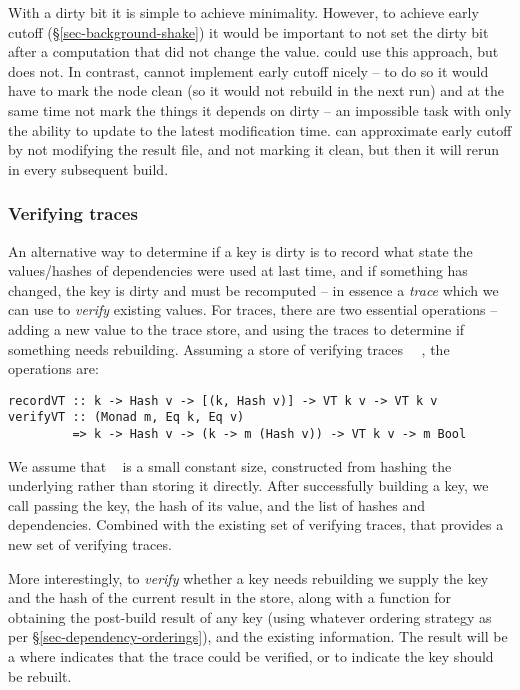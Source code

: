 With a dirty bit it is simple to achieve minimality. However, to achieve early cutoff
(\S\ref{sec-background-shake}) it would be important to not set the dirty bit
after a computation that did not change the value. \Excel could use this
approach, but does not. In contrast, \Make cannot implement early cutoff nicely -- to
do so it would have to mark the node clean (so it would not rebuild in the next
run) and at the same time not mark the things it depends on dirty -- an
impossible task with only the ability to update to the latest modification time.
\Make can approximate early cutoff by not modifying the result file, and not marking it clean,
but then it will rerun in every subsequent build.

\vspace{-2mm}
\subsubsection{Verifying traces}\label{sec-verifying-traces}

An alternative way to determine if a key is dirty is to record what state the
values/hashes of dependencies were used at last time, and if something has
changed, the key is dirty and must be recomputed -- in essence a \emph{trace}
which we can use to \emph{verify} existing values. For traces, there are two essential
operations -- adding a new value to the trace store, and using the traces to determine if something needs
rebuilding. Assuming a store of verifying traces ~~, the operations are:

\begin{verbatim}
recordVT :: k -> Hash v -> [(k, Hash v)] -> VT k v -> VT k v
verifyVT :: (Monad m, Eq k, Eq v)
         => k -> Hash v -> (k -> m (Hash v)) -> VT k v -> m Bool
\end{verbatim}

We assume that ~ is a small constant size, constructed from hashing the
underlying  rather than storing it directly. After successfully building a key, we call  passing the key, the hash of its value, and the list of hashes and dependencies. Combined with the existing set of verifying traces, that provides a new set of verifying traces.

More interestingly, to \emph{verify} whether a key needs rebuilding we supply the key and the hash of the current result in the store, along with a function for obtaining the post-build result of any key (using whatever ordering strategy
as per \S\ref{sec-dependency-orderings}), and the existing  information. The result will be a  where  indicates that the trace could be verified, or  to indicate the key should be rebuilt.

